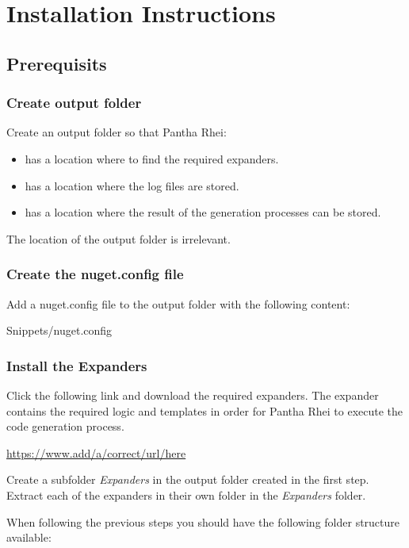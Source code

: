 \chapter{Installation Instructions} \label{appendix:installation_instructions} 

\section{Prerequisits} \label{appendix:installation_prerequisits} 

\subsection*{Create output folder}
Create an output folder so that Pantha Rhei:
\begin{itemize}
    \item has a location where to find the required expanders.
    \item has a location where the log files are stored.
    \item has a location where the result of the generation processes can be stored.
\end{itemize}

The location of the output folder is irrelevant.

\subsection*{Create the nuget.config file}
Add a nuget.config file to the output folder with the following content:

    {Snippets/nuget.config}

\subsection*{Install the Expanders}
Click the following link and download the required expanders. The expander contains the
required logic and templates in order for Pantha Rhei to execute the code generation process.

\url{https://www.add/a/correct/url/here}

Create a subfolder \emph{Expanders} in the output folder created in the first step. Extract
each of the expanders in their own folder in the \emph{Expanders} folder.

When following the previous steps you should have the following folder structure
available:

